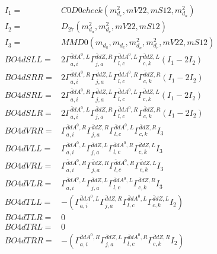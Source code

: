 \documentclass[A4,landscape]{article}
\begin{document}
\begin{align} 
I_1 = & C0D0check(m^2_{d_{{c}}}, mV22, mS12, m^2_{d_{{a}}}) \\ 
I_2 = & D_{27}(m^2_{d_{{a}}}, m^2_{d_{{c}}}, mV22, mS12) \\ 
I_3 = & MMD0(m_{d_{{a}}}, m_{d_{{c}}}, m^2_{d_{{a}}}, m^2_{d_{{c}}}, mV22, mS12) \\ 
  BO4dSLL= & 2  \Gamma^{\bar{d}d A^0 ,L}_{a, i} \Gamma^{\bar{d}d Z ,R}_{j, a} \Gamma^{\bar{d}d A^0 ,L}_{l, c} \Gamma^{\bar{d}d Z ,L}_{c, k} (I_1 - 2 I_2) \\ 
  BO4dSRR= & 2  \Gamma^{\bar{d}d A^0 ,R}_{a, i} \Gamma^{\bar{d}d Z ,L}_{j, a} \Gamma^{\bar{d}d A^0 ,R}_{l, c} \Gamma^{\bar{d}d Z ,R}_{c, k} (I_1 - 2 I_2) \\ 
  BO4dSRL= & 2  \Gamma^{\bar{d}d A^0 ,R}_{a, i} \Gamma^{\bar{d}d Z ,L}_{j, a} \Gamma^{\bar{d}d A^0 ,L}_{l, c} \Gamma^{\bar{d}d Z ,L}_{c, k} (I_1 - 2 I_2) \\ 
  BO4dSLR= & 2  \Gamma^{\bar{d}d A^0 ,L}_{a, i} \Gamma^{\bar{d}d Z ,R}_{j, a} \Gamma^{\bar{d}d A^0 ,R}_{l, c} \Gamma^{\bar{d}d Z ,R}_{c, k} (I_1 - 2 I_2) \\ 
  BO4dVRR= &  \Gamma^{\bar{d}d A^0 ,R}_{a, i} \Gamma^{\bar{d}d Z ,R}_{j, a} \Gamma^{\bar{d}d A^0 ,L}_{l, c} \Gamma^{\bar{d}d Z ,R}_{c, k} I_3 \\ 
  BO4dVLL= &  \Gamma^{\bar{d}d A^0 ,L}_{a, i} \Gamma^{\bar{d}d Z ,L}_{j, a} \Gamma^{\bar{d}d A^0 ,R}_{l, c} \Gamma^{\bar{d}d Z ,L}_{c, k} I_3 \\ 
  BO4dVRL= &  \Gamma^{\bar{d}d A^0 ,R}_{a, i} \Gamma^{\bar{d}d Z ,R}_{j, a} \Gamma^{\bar{d}d A^0 ,R}_{l, c} \Gamma^{\bar{d}d Z ,L}_{c, k} I_3 \\ 
  BO4dVLR= &  \Gamma^{\bar{d}d A^0 ,L}_{a, i} \Gamma^{\bar{d}d Z ,L}_{j, a} \Gamma^{\bar{d}d A^0 ,L}_{l, c} \Gamma^{\bar{d}d Z ,R}_{c, k} I_3 \\ 
  BO4dTLL= & -( \Gamma^{\bar{d}d A^0 ,L}_{a, i} \Gamma^{\bar{d}d Z ,R}_{j, a} \Gamma^{\bar{d}d A^0 ,L}_{l, c} \Gamma^{\bar{d}d Z ,L}_{c, k} I_2) \\ 
  BO4dTLR= & 0 \\ 
  BO4dTRL= & 0 \\ 
  BO4dTRR= & -( \Gamma^{\bar{d}d A^0 ,R}_{a, i} \Gamma^{\bar{d}d Z ,L}_{j, a} \Gamma^{\bar{d}d A^0 ,R}_{l, c} \Gamma^{\bar{d}d Z ,R}_{c, k} I_2) \\ 
\end{align} 
\end{document}
